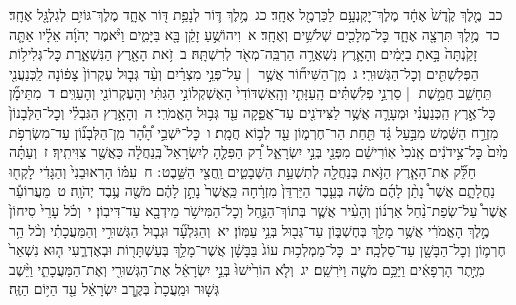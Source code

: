\documentclass[18pt]{article}
\newcommand{\vart}[1]{\Bfootnote{#1}}	%
\begin{document}
 {\loc כב~}מֶ֤לֶךְ קֶ֙דֶשׁ֙ אֶחָ֔ד      מֶלֶךְ־יׇקְנְעָ֥ם לַכַּרְמֶ֖ל אֶחָֽד׃ \startlock
 {\loc כג~}מֶ֥לֶךְ דּ֛וֹר לְנָפַ֥ת דּ֖וֹר אֶחָ֑ד      מֶלֶךְ־גּוֹיִ֥ם לְגִלְגָּ֖ל אֶחָֽד׃ \startlock
 {\loc כד~}מֶ֥לֶךְ תִּרְצָ֖ה אֶחָ֑ד      כׇּל־מְלָכִ֖ים שְׁלֹשִׁ֥ים וְאֶחָֽד׃ 
\startlock
 {\loc א~}וִיהוֹשֻׁ֣עַ זָקֵ֔ן בָּ֖א בַּיָּמִ֑ים וַיֹּ֨אמֶר יְהֹוָ֜ה אֵלָ֗יו אַתָּ֤ה זָקַ֙נְתָּה֙ בָּ֣אתָ בַיָּמִ֔ים וְהָאָ֛רֶץ נִשְׁאֲרָ֥ה הַרְבֵּֽה־מְאֹ֖ד לְרִשְׁתָּֽהּ׃ \startlock
 {\loc ב~}זֹ֥את הָאָ֖רֶץ הַנִּשְׁאָ֑רֶת כׇּל־גְּלִיל֥וֹת הַפְּלִשְׁתִּ֖ים וְכׇל־הַגְּשׁוּרִֽי׃ \startlock
 {\loc ג~}מִֽן־הַשִּׁיח֞וֹר אֲשֶׁ֣ר  |  עַל־פְּנֵ֣י מִצְרַ֗יִם וְעַ֨ד גְּב֤וּל עֶקְרוֹן֙ צָפ֔וֹנָה לַֽכְּנַעֲנִ֖י תֵּחָשֵׁ֑ב חֲמֵ֣שֶׁת  |  סַרְנֵ֣י פְלִשְׁתִּ֗ים הָֽעַזָּתִ֤י וְהָֽאַשְׁדּוֹדִי֙ הָאֶשְׁקְלוֹנִ֣י הַגִּתִּ֔י וְהָעֶקְרוֹנִ֖י וְהָעַוִּֽים׃ \startlock
 {\loc ד~}מִתֵּימָ֞ן כׇּל־אֶ֣רֶץ הַֽכְּנַעֲנִ֗י וּמְעָרָ֛ה אֲשֶׁ֥ר לַצִּידֹנִ֖ים עַד־אֲפֵ֑קָה עַ֖ד גְּב֥וּל הָאֱמֹרִֽי׃ \startlock
 {\loc ה~}וְהָאָ֣רֶץ הַגִּבְלִ֗י וְכׇל־הַלְּבָנוֹן֙ מִזְרַ֣ח הַשֶּׁ֔מֶשׁ מִבַּ֣עַל גָּ֔ד תַּ֖חַת הַר־חֶרְמ֑וֹן עַ֖ד לְב֥וֹא חֲמָֽת׃ \startlock
 {\loc ו~}כׇּל־יֹשְׁבֵ֣י הָ֠הָ֠ר מִֽן־הַלְּבָנ֞וֹן עַד־מִשְׂרְפֹ֥ת מַ֙יִם֙ כׇּל־צִ֣ידֹנִ֔ים אָֽנֹכִי֙ אֽוֹרִישֵׁ֔ם מִפְּנֵ֖י בְּנֵ֣י יִשְׂרָאֵ֑ל רַ֠ק הַפִּלֶ֤הָ לְיִשְׂרָאֵל֙ בְּֽנַחֲלָ֔ה כַּאֲשֶׁ֖ר צִוִּיתִֽיךָ׃ \startlock
 {\loc ז~}וְעַתָּ֗ה חַלֵּ֞ק אֶת־הָאָ֧רֶץ הַזֹּ֛את בְּנַחֲלָ֖ה לְתִשְׁעַ֣ת הַשְּׁבָטִ֑ים וַֽחֲצִ֖י הַשֵּׁ֥בֶט  \edtext{הַֽמְנַשֶּֽׁה}{\vart{א=הַֽמֲנַשֶּֽׁה | }} ׃ \startlock
 {\loc ח~}עִמּ֗וֹ הָרֽאוּבֵנִי֙ וְהַגָּדִ֔י לָקְח֖וּ נַחֲלָתָ֑ם אֲשֶׁר֩ נָתַ֨ן לָהֶ֜ם מֹשֶׁ֗ה בְּעֵ֤בֶר הַיַּרְדֵּן֙ מִזְרָ֔חָה כַּֽאֲשֶׁר֙ נָתַ֣ן לָהֶ֔ם מֹשֶׁ֖ה עֶ֥בֶד יְהֹוָֽה׃ \startlock
 {\loc ט~}מֵעֲרוֹעֵ֡ר אֲשֶׁר֩ עַל־שְׂפַת־נַ֨חַל אַרְנ֜וֹן וְהָעִ֨יר אֲשֶׁ֧ר בְּתוֹךְ־הַנַּ֛חַל וְכׇל־הַמִּישֹׁ֥ר מֵידְבָ֖א עַד־דִּיבֽוֹן׃ \startlock
 {\loc י~}וְכֹ֗ל עָרֵי֙ סִיחוֹן֙ מֶ֣לֶךְ הָאֱמֹרִ֔י אֲשֶׁ֥ר מָלַ֖ךְ בְּחֶשְׁבּ֑וֹן עַד־גְּב֖וּל בְּנֵ֥י עַמּֽוֹן׃ \startlock
 {\loc יא~}וְהַגִּלְעָ֞ד וּגְב֧וּל הַגְּשׁוּרִ֣י וְהַמַּעֲכָתִ֗י וְכֹ֨ל הַ֥ר חֶרְמ֛וֹן וְכׇל־הַבָּשָׁ֖ן עַד־סַלְכָֽה׃ \startlock
 {\loc יב~}כׇּל־מַמְלְכ֥וּת עוֹג֙ בַּבָּשָׁ֔ן אֲשֶׁר־מָלַ֥ךְ בְּעַשְׁתָּר֖וֹת וּבְאֶדְרֶ֑עִי ה֤וּא נִשְׁאַר֙ מִיֶּ֣תֶר הָרְפָאִ֔ים וַיַּכֵּ֥ם מֹשֶׁ֖ה וַיֹּרִשֵֽׁם׃ \startlock
 {\loc יג~}וְלֹ֤א הוֹרִ֙ישׁוּ֙ בְּנֵ֣י יִשְׂרָאֵ֔ל אֶת־הַגְּשׁוּרִ֖י וְאֶת־הַמַּעֲכָתִ֑י וַיֵּ֨שֶׁב גְּשׁ֤וּר וּמַֽעֲכָת֙ בְּקֶ֣רֶב יִשְׂרָאֵ֔ל עַ֖ד הַיּ֥וֹם הַזֶּֽה׃ \startlock
\end{document}
